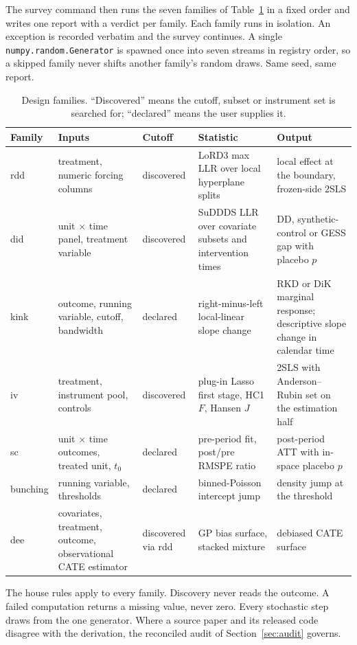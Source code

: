\documentclass[11pt]{article}
\newcommand{\code}[1]{\texttt{#1}}
\begin{document}
The survey command then runs the seven families of Table~\ref{tab:families} in a fixed
order and writes one report with a verdict per family. Each family runs in isolation. An
exception is recorded verbatim and the survey continues. A single
\code{numpy.random.Generator} is spawned once into seven streams in registry order, so a
skipped family never shifts another family's random draws. Same seed, same report.

\begin{table}[t]
\centering
\small
\caption{Design families. ``Discovered'' means the cutoff, subset or instrument set is
searched for; ``declared'' means the user supplies it.}
\label{tab:families}
\begin{tabular}{@{}p{1.5cm}p{3.6cm}p{1.7cm}p{3.9cm}p{4.0cm}@{}}
\toprule
Family & Inputs & Cutoff & Statistic & Output \\
\midrule
rdd & treatment, numeric forcing columns & discovered & LoRD3 max LLR over local hyperplane splits & local effect at the boundary, frozen-side 2SLS \\
did & unit $\times$ time panel, treatment variable & discovered & SuDDDS LLR over covariate subsets and intervention times & DD, synthetic-control or GESS gap with placebo $p$ \\
kink & outcome, running variable, cutoff, bandwidth & declared & right-minus-left local-linear slope change & RKD or DiK marginal response; descriptive slope change in calendar time \\
iv & treatment, instrument pool, controls & discovered & plug-in Lasso first stage, HC1 $F$, Hansen $J$ & 2SLS with Anderson--Rubin set on the estimation half \\
sc & unit $\times$ time outcomes, treated unit, $t_0$ & declared & pre-period fit, post/pre RMSPE ratio & post-period ATT with in-space placebo $p$ \\
bunching & running variable, thresholds & declared & binned-Poisson intercept jump & density jump at the threshold \\
dee & covariates, treatment, outcome, observational CATE estimator & discovered via rdd & GP bias surface, stacked mixture & debiased CATE surface \\
\bottomrule
\end{tabular}
\end{table}

The house rules apply to every family. Discovery never reads the outcome. A failed
computation returns a missing value, never zero. Every stochastic step draws from the one
generator. Where a source paper and its released code disagree with the derivation, the
reconciled audit of Section~\ref{sec:audit} governs.
\end{document}
